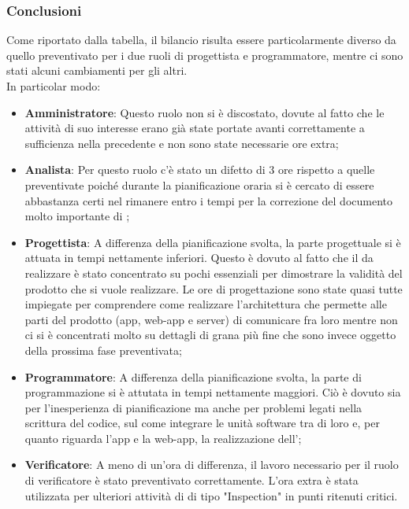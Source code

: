 \subsubsection{Conclusioni}
Come riportato dalla tabella, il bilancio risulta essere particolarmente diverso da quello preventivato per i due ruoli di progettista e programmatore, mentre ci sono stati alcuni cambiamenti per gli altri.\\
In particolar modo:
\begin{itemize}
	\item \textbf{Amministratore}: Questo ruolo non si è discostato, dovute al fatto che le attività di suo interesse erano già state portate avanti correttamente a sufficienza nella precedente  e non sono state necessarie ore extra;
	\item \textbf{Analista}: Per questo ruolo c'è stato un difetto di 3 ore rispetto a quelle preventivate poiché durante la pianificazione oraria si è cercato di essere abbastanza certi nel rimanere entro i tempi per la correzione del documento molto importante di \AdR{};
	\item \textbf{Progettista}: A differenza della pianificazione svolta, la parte progettuale si è attuata in tempi nettamente inferiori. Questo è dovuto al fatto che il  da realizzare è stato concentrato su pochi  essenziali per dimostrare la validità
	del prodotto che si vuole realizzare. Le ore di progettazione sono state quasi tutte impiegate per comprendere come realizzare l'architettura che permette alle parti del prodotto (app, web-app e server) di comunicare fra loro mentre non ci si è concentrati molto su dettagli
	di grana più fine che sono invece oggetto della prossima fase preventivata;
	\item \textbf{Programmatore}: A differenza della pianificazione svolta, la parte di programmazione si è attutata in tempi nettamente maggiori. Ciò è dovuto sia per 
	l'inesperienza di pianificazione ma anche per problemi legati nella scrittura del codice, sul come integrare le unità software tra di loro e, per quanto riguarda l'app e la web-app, la realizzazione dell';
	\item \textbf{Verificatore}: A meno di un'ora di differenza, il lavoro necessario per il ruolo di verificatore è stato preventivato correttamente. L'ora extra è stata utilizzata per ulteriori attività di  di tipo "Inspection" in punti ritenuti critici.
\end{itemize}
